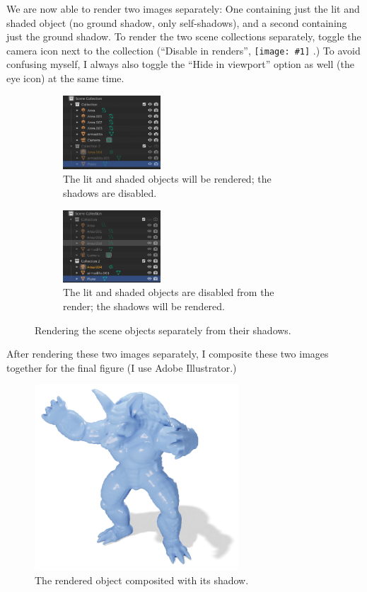 \documentclass[10pt]{article}
\DeclareRobustCommand{\inlinepic}[1]{%
  \begingroup\normalfont
  \texttt{[image: \#1]}%
  \endgroup
}
\begin{document}
We are now able to render two images separately: One containing just the lit and shaded object (no ground shadow, only self-shadows), and a second containing just the ground shadow. To render the two scene collections separately, toggle the camera icon next to the collection (``Disable in renders'', \inlinepic{images/disable-in-viewport-render.png}.) To avoid confusing myself, I always also toggle the ``Hide in viewport'' option as well (the eye icon) at the same time.
\begin{figure}[H]
    \centering
    \captionsetup{width=0.8\textwidth}
    \begin{subfigure}[b]{0.9\textwidth}
     \centering
     \includegraphics[width=0.4\textwidth]{images/collection-on-shadow-off.png}
     \caption{The lit and shaded objects will be rendered; the shadows are disabled.}
    \end{subfigure} 
    \begin{subfigure}[b]{0.9\textwidth}
     \centering
     \includegraphics[width=0.4\textwidth]{images/collection-off-shadow-on.png}
     \caption{The lit and shaded objects are disabled from the render; the shadows will be rendered.}
    \end{subfigure}
    \caption{Rendering the scene objects separately from their shadows.}
    \label{fig:disable-in-render}
\end{figure}
After rendering these two images separately, I composite these two images together for the final figure (I use Adobe Illustrator.)
\begin{figure}[H]
    \centering
    \includegraphics[width=3in]{images/final-render-with-shadow.png}
    \caption{The rendered object composited with its shadow.}
    \label{fig:final-render-with-shadow}
\end{figure}
\end{document}
